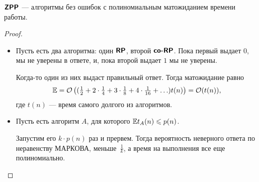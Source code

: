 \begin{defn}\index{\ZPP}
	$ \textmd{\textbf{\textsf{ZPP}}}$ --- алгоритмы без ошибок с полиномиальным матожиданием времени работы.
\end{defn}
\begin{proof}
	\begin{itemize}
		\item
			Пусть есть два алгоритма: один $ \textmd{\textbf{\textsf{RP}}}$, второй $ \textmd{\textbf{\textsf{co-RP}}}$. Пока первый выдает  $ 0$, мы не уверены в ответе, и, пока второй выдает $ 1$ мы не уверены.

			Когда-то один из них выдаст правильный ответ.
			Тогда матожидание равно
			\[
				\mathbb{E} = \mathcal{O}\left( (\tfrac{1}{2} + 2\cdot \tfrac{1}{4}+ 3\cdot \tfrac{1}{8} + 4\cdot \tfrac{1}{16} + \ldots ) t(n)\right)  = \mathcal{O}(t(n))
			,\]
			где $ t(n)$ --- время самого долгого из алгоритмов.
		\item Пусть есть алгоритм $A $, для которого $ \mathbb{E} t_{A}(n) \leqslant p(n)$.

			Запустим его  $ k \cdot  p(n)$ раз и прервем.
			Тогда вероятность неверного ответа по неравенству МАРКОВА, меньше~$ \frac{1}{k}$, а время на выполнения все еще полиномиально.
	\end{itemize}
\end{proof}

